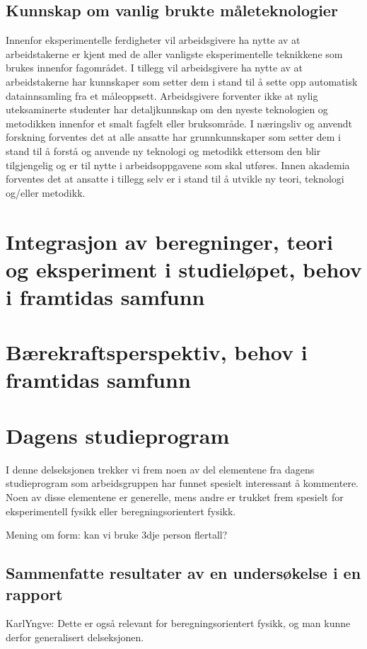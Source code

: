 \documentclass{article}
\begin{document}
\subsection{Kunnskap om vanlig brukte måleteknologier}
Innenfor eksperimentelle ferdigheter vil arbeidsgivere ha nytte av at arbeidstakerne er kjent med de aller vanligste eksperimentelle teknikkene som brukes innenfor fagområdet.
I tillegg vil arbeidsgivere ha nytte av at arbeidstakerne har kunnskaper som setter dem i stand til å sette opp automatisk datainnsamling fra et måleoppsett.
Arbeidsgivere forventer ikke at nylig uteksaminerte studenter har detaljkunnskap om den nyeste teknologien og metodikken innenfor et smalt fagfelt eller bruksområde.
I næringsliv og anvendt forskning forventes det at alle ansatte har grunnkunnskaper som setter dem i stand til å forstå og anvende ny teknologi og metodikk ettersom den blir tilgjengelig og er til nytte i arbeidsoppgavene som skal utføres.
Innen akademia forventes det at ansatte i tillegg selv er i stand til å utvikle ny teori, teknologi og/eller metodikk.

\section{Integrasjon av beregninger, teori og eksperiment i studieløpet, behov i framtidas samfunn}

\section{Bærekraftsperspektiv, behov i framtidas samfunn}

\section{Dagens studieprogram}
\label{Sammenlikning}

I denne delseksjonen trekker vi frem noen av del elementene fra dagens studieprogram som arbeidsgruppen har funnet spesielt interessant å kommentere.
Noen av disse elementene er generelle, mens andre er trukket frem spesielt for eksperimentell fysikk eller beregningsorientert fysikk.

{\color{red} Mening om form: kan vi bruke 3dje person flertall?}

\subsection{Sammenfatte resultater av en undersøkelse i en rapport}
\label{Rapport}
{\color{red} KarlYngve: Dette er også relevant for beregningsorientert fysikk, og man kunne derfor generalisert delseksjonen.}
\end{document}
